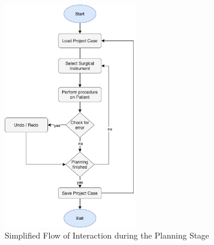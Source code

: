 \begin{figure}[ht!]
    \centering
    \includegraphics[width=225px]{images/implementation/interaction_flow.png}
    \caption{\label{fig::InteractionFlow} Simplified Flow of Interaction during the Planning Stage}
\end{figure}

